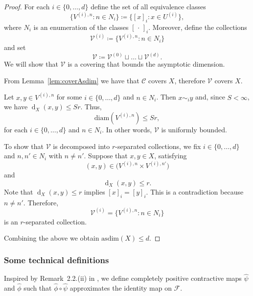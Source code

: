 \documentclass[a4paper]{amsart}
\numberwithin{equation}{section}
\newcommand{\Fcal}{\mathcal{F}}
\newcommand{\Vcal}{\mathcal{V}}
\newcommand{\prn}[1]{{(#1)}}
\DeclareMathOperator{\dist}{d}
\newcommand{\diam}[1]{\mathrm{diam} ({#1})}
\newcommand{\distX}[2]{{\dist_X ( #1, #2 )}}
\newcommand{\asdim}[1]{\mathrm{asdim}({#1})}
\theoremstyle{plain}
\theoremstyle{indented}
\numberwithin{equation}{section}
\theoremstyle{definition}
\theoremstyle{remark}
\theoremstyle{plain}
\theoremstyle{definition}
\begin{document}
    \begin{proof}
     For each ${i\in \{0,\hdots,d\}}$ define the set of all equivalence classes
    \begin{equation*}
        \Big\{ V^{(i),n} \colon n \in N_i  \Big\} \coloneq \Big\{ [ x ]_{i} \colon  x \in U^{\prn{i}} \Big\}  ,
    \end{equation*}
    where $N_i$ is an enumeration of the classes ${[\,\cdot\,]_{i}}$.
    Moreover, define the collections
    \begin{equation*}
        \Vcal^{(i)} \coloneq  \Big\{ V^{(i),n} \colon n \in N_i  \Big\}
    \end{equation*}
    and set
    \begin{equation*}
        \Vcal \coloneq  \Vcal^{(0)} \sqcup \hdots \sqcup  \Vcal^{(d)}.
    \end{equation*}
    We will show that $\Vcal$ is a covering that bounds the asymptotic dimension. 

    From Lemma~\ref{lem:coverAsdim} we have that ${\mathcal{C}}$ covers $X$, 
  therefore $\Vcal$ covers $X$.

    Let ${x, y \in V^{(i),n}}$ for some ${i\in \{0,\hdots,d\}}$ and ${n \in N_i}$. 
    Then ${x \sim_i y}$ and, since ${S < \infty }$, we have
    ${\distX{x}{y} \le S r}$.
    Thus, 
    \[\diam{V^{(i),n}} \le S r,\]
    for each ${i\in \{0,\hdots,d\}}$ and ${n \in N_i}$.
    In other words, ${\Vcal}$ is uniformly bounded.
      
    To show that $\Vcal$ is decomposed into $r$-separated collections, 
    we fix ${i\in \{0,\hdots,d\}}$ and ${n, n' \in N_i}$ with ${n \ne n'}$. 
    Suppose that ${x, y \in X}$, satisfying 
    \[(x,y) \in  \big(V^{(i),n}  \times  V^{(i),n'}  \big) \]
    and
    \[ {\distX{x}{y} \le r}. \]
    Note that ${\distX{x}{y} \le r}$
    implies
    ${[ x ]_{i} = [ y ]_{i}}$.
    This is a contradiction because ${n \ne n'}$. Therefore,
    \[ \Vcal^{(i)} =  \Big\{ V^{(i),n} \colon n \in N_i  \Big\} \]
    is an $r$-separated collection.

     Combining the above we obtain 
        ${\asdim{X} \le d}$.  \qedhere    
    \end{proof}
    

\smallskip
\subsubsection{Some technical definitions}
    Inspired by Remark~2.2.(ii) in \cite{LiLiaoWinter2023diagDim}, 
    we define completely positive contractive maps $\widehat{\psi}$ and $\widehat{\phi}$ 
    such that ${\widehat{\phi} \circ \widehat{\psi}}$ approximates the identity map on $\Fcal$.
    
\end{document}
